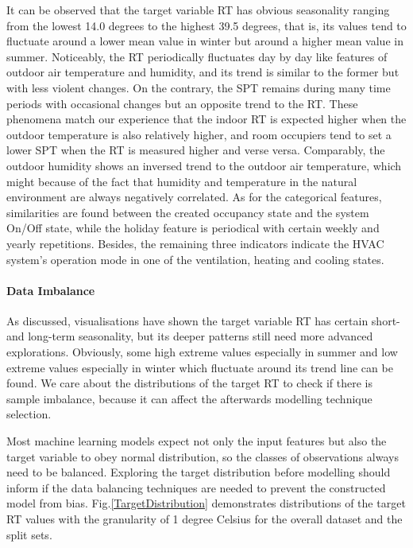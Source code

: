 \documentclass[11pt]{article}
\begin{document}
    It can be observed that the target variable RT has obvious seasonality ranging from the lowest 14.0 degrees to the highest 39.5 degrees, that is, its values tend to fluctuate around a lower mean value in winter but around a higher mean value in summer. Noticeably, the RT periodically fluctuates day by day like features of outdoor air temperature and humidity, and its trend is similar to the former but with less violent changes. On the contrary, the SPT remains during many time periods with occasional changes but an opposite trend to the RT. These phenomena match our experience that the indoor RT is expected higher when the outdoor temperature is also relatively higher, and room occupiers tend to set a lower SPT when the RT is measured higher and verse versa. Comparably, the outdoor humidity shows an inversed trend to the outdoor air temperature, which might because of the fact that humidity and temperature in the natural environment are always negatively correlated. As for the categorical features, similarities are found between the created occupancy state and the system On/Off state, while the holiday feature is periodical with certain weekly and yearly repetitions. Besides, the remaining three indicators indicate the HVAC system’s operation mode in one of the ventilation, heating and cooling states.
    
    \paragraph{Data Imbalance}
    As discussed, visualisations have shown the target variable RT has certain short- and long-term seasonality, but its deeper patterns still need more advanced explorations. Obviously, some high extreme values especially in summer and low extreme values especially in winter which fluctuate around its trend line can be found. We care about the distributions of the target RT to check if there is sample imbalance, because it can affect the afterwards modelling technique selection.
    
    Most machine learning models expect not only the input features but also the target variable to obey normal distribution, so the classes of observations always need to be balanced. Exploring the target distribution before modelling should inform if the data balancing techniques are needed to prevent the constructed model from bias. Fig.\ref{TargetDistribution} demonstrates distributions of the target RT values with the granularity of 1 degree Celsius for the overall dataset and the split sets.
    
\end{document}
